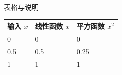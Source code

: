 \begin{frame}{表格与说明}
  \begin{tabularx}{\linewidth}{@{}XXX@{}}
    \toprule
    输入 $x$ & 线性函数 $x$ & 平方函数 $x^2$ \\
    \midrule
    0 & 0 & 0 \\
    0.5 & 0.5 & 0.25 \\
    1 & 1 & 1 \\
    \bottomrule
  \end{tabularx}
\end{frame}
